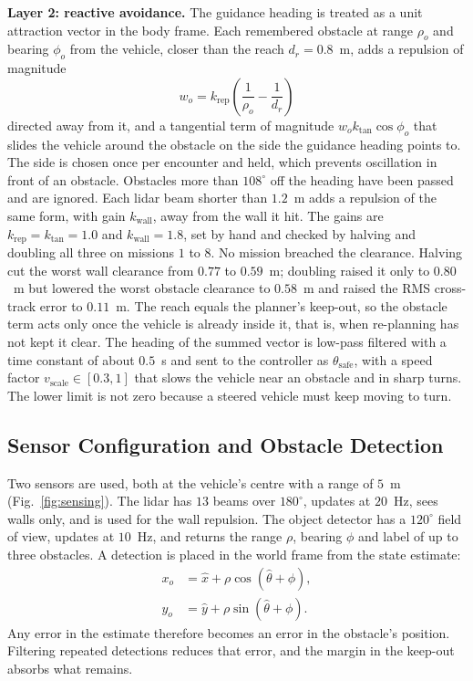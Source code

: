 \textbf{Layer 2: reactive avoidance.} The guidance heading is treated
as a unit attraction vector in the body frame. Each remembered obstacle
at range $\rho_{o}$ and bearing $\phi_{o}$ from the vehicle, closer than
the reach $d_{r} = 0.8$~m, adds a repulsion of magnitude
\begin{equation}
    w_{o} = k_{\text{rep}}\left(\frac{1}{\rho_{o}} - \frac{1}{d_{r}}\right)
    \label{eq:repulsion}
\end{equation}
directed away from it, and a tangential term of magnitude
$w_{o}k_{\text{tan}}\cos\phi_{o}$ that slides the vehicle around the
obstacle on the side the guidance heading points to. The side is chosen
once per encounter and held, which prevents oscillation in front of an
obstacle. Obstacles more than $108^{\circ}$ off the heading have been
passed and are ignored.
Each lidar beam shorter than $1.2$~m adds a repulsion of the same form,
with gain $k_{\text{wall}}$, away from the wall it hit. The gains are
$k_{\text{rep}} = k_{\text{tan}} = 1.0$ and $k_{\text{wall}} = 1.8$, set by
hand and checked by halving and doubling all three on missions $1$
to $8$. No mission breached the clearance. Halving cut the worst wall
clearance from $0.77$ to $0.59$~m; doubling raised it only to $0.80$~m
but lowered the worst obstacle clearance to $0.58$~m and raised the RMS
cross-track error to $0.11$~m. The reach equals the planner's keep-out, so the
obstacle term acts only once the vehicle is already inside it, that is,
when re-planning has not kept it clear. The
heading of the summed vector is low-pass filtered with a time constant
of about $0.5$~s and sent to the controller as $\theta_{\text{safe}}$,
with a speed factor $v_{\text{scale}} \in [0.3, 1]$ that slows the
vehicle near an obstacle and in sharp turns. The lower limit is not
zero because a steered vehicle must keep moving to turn.

\subsection{Sensor Configuration and Obstacle Detection}
Two sensors are used, both at the vehicle's centre with a range of
$5$~m (Fig.~\ref{fig:sensing}). The lidar has $13$ beams over
$180^{\circ}$, updates at $20$~Hz, sees walls only, and is used for the
wall repulsion. The object detector has a $120^{\circ}$ field of view,
updates at $10$~Hz, and returns the range $\rho$, bearing $\phi$ and
label of up to three obstacles. A detection is placed in the world
frame from the state estimate:
\begin{equation}
\begin{aligned}
    x_{o} &= \hat{x} + \rho\cos(\hat{\theta} + \phi), \\
    y_{o} &= \hat{y} + \rho\sin(\hat{\theta} + \phi).
\end{aligned}
\label{eq:detection}
\end{equation}
Any error in the estimate therefore becomes an error in the obstacle's
position. Filtering repeated detections reduces that error, and the
margin in the keep-out absorbs what remains.

